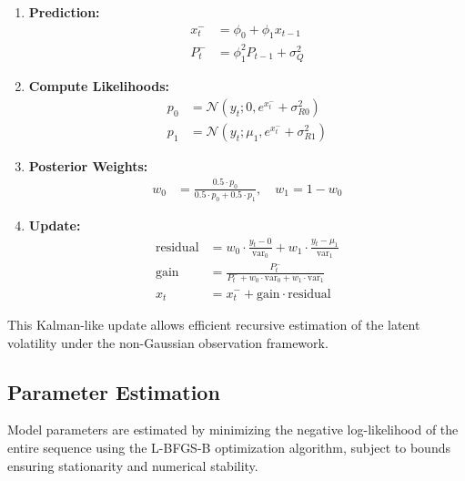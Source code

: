 \begin{enumerate}
    \item \textbf{Prediction:}
    \begin{align}
        x_t^- &= \phi_0 + \phi_1 x_{t-1} \\
        P_t^- &= \phi_1^2 P_{t-1} + \sigma_Q^2
    \end{align}
    
    \item \textbf{Compute Likelihoods:}
    \begin{align}
        p_0 &= \mathcal{N}(y_t; 0, e^{x_t^-} + \sigma_{R0}^2) \\
        p_1 &= \mathcal{N}(y_t; \mu_1, e^{x_t^-} + \sigma_{R1}^2)
    \end{align}
    
    \item \textbf{Posterior Weights:}
    \begin{align}
        w_0 &= \frac{0.5 \cdot p_0}{0.5 \cdot p_0 + 0.5 \cdot p_1}, \quad w_1 = 1 - w_0
    \end{align}
    
    \item \textbf{Update:}
    \begin{align}
        \text{residual} &= w_0 \cdot \frac{y_t - 0}{\text{var}_0} + w_1 \cdot \frac{y_t - \mu_1}{\text{var}_1} \\
        \text{gain} &= \frac{P_t^-}{P_t^- + w_0 \cdot \text{var}_0 + w_1 \cdot \text{var}_1} \\
        x_t &= x_t^- + \text{gain} \cdot \text{residual}
    \end{align}
\end{enumerate}

This Kalman-like update allows efficient recursive estimation of the latent volatility under the non-Gaussian observation framework.

\subsection{Parameter Estimation}

Model parameters are estimated by minimizing the negative log-likelihood of the entire sequence using the L-BFGS-B optimization algorithm, subject to bounds ensuring stationarity and numerical stability.


